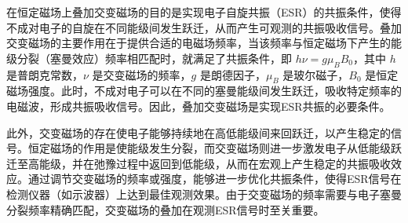 \documentclass[dvipsnames, svgnames,a4paper,11pt]{article}
\begin{document}

		
		



在恒定磁场上叠加交变磁场的目的是实现电子自旋共振（ESR）的共振条件，使得不成对电子的自旋在不同能级间发生跃迁，从而产生可观测的共振吸收信号。叠加交变磁场的主要作用在于提供合适的电磁场频率，当该频率与恒定磁场下产生的能级分裂（塞曼效应）频率相匹配时，就满足了共振条件，即 \( h\nu = g\mu_B B_0 \)，其中 \( h \) 是普朗克常数，\( \nu \) 是交变磁场的频率，\( g \) 是朗德因子，\( \mu_B \) 是玻尔磁子，\( B_0 \) 是恒定磁场强度。此时，不成对电子可以在不同的塞曼能级间发生跃迁，吸收特定频率的电磁波，形成共振吸收信号。因此，叠加交变磁场是实现ESR共振的必要条件。

此外，交变磁场的存在使电子能够持续地在高低能级间来回跃迁，以产生稳定的信号。恒定磁场的作用是使能级发生分裂，而交变磁场则进一步激发电子从低能级跃迁至高能级，并在弛豫过程中返回到低能级，从而在宏观上产生稳定的共振吸收效应。通过调节交变磁场的频率或强度，能够进一步优化共振条件，使得ESR信号在检测仪器（如示波器）上达到最佳观测效果。由于交变磁场的频率需要与电子塞曼分裂频率精确匹配，交变磁场的叠加在观测ESR信号时至关重要。
\end{document}
